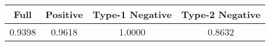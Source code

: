 \begin{tabular}{cccc}
\toprule
Full & Positive & Type-1 Negative & Type-2 Negative \\
\midrule
0.9398 & 0.9618 & 1.0000 & 0.8632 \\
\bottomrule
\end{tabular}
